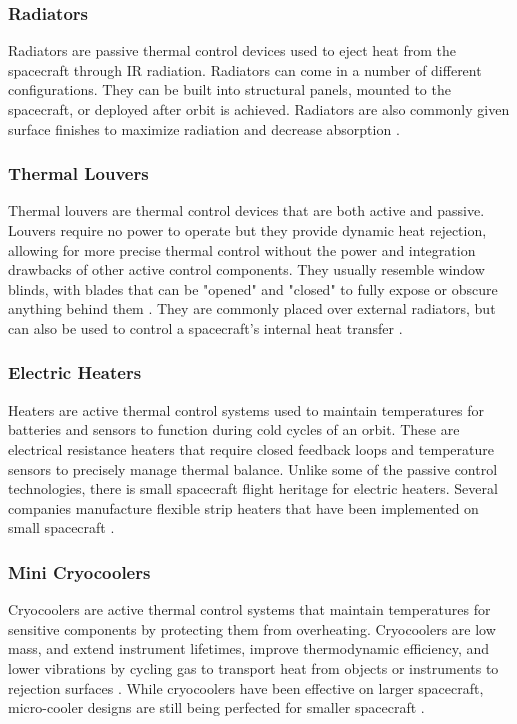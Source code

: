 \subsubsection{Radiators}
Radiators are passive thermal control devices used to eject heat from the spacecraft through IR radiation. Radiators can come in a number of different configurations. They can be built into structural panels, mounted to the spacecraft, or deployed after orbit is achieved. Radiators are also commonly given surface finishes to maximize radiation and decrease absorption \cite{SMAD}. 

\subsubsection{Thermal Louvers}
Thermal louvers are thermal control devices that are both active and passive. Louvers require no power to operate but they provide dynamic heat rejection, allowing for more precise thermal control without the power and integration drawbacks of other active control components. They usually resemble window blinds, with blades that can be "opened" and "closed" to fully expose or obscure anything behind them \cite{SMAD}. They are commonly placed over external radiators, but can also be used to control a spacecraft's internal heat transfer \cite{SMAD}.

\subsubsection{Electric Heaters}
Heaters are active thermal control systems used to maintain temperatures for batteries and sensors to function during cold cycles of an orbit. These are electrical resistance heaters that require closed feedback loops and temperature sensors to precisely manage thermal balance. Unlike some of the passive control technologies, there is small spacecraft flight heritage for electric heaters. Several companies manufacture flexible strip heaters that have been implemented on small spacecraft \cite{thermo}. 

\subsubsection{Mini Cryocoolers}
Cryocoolers are active thermal control systems that maintain temperatures for sensitive components by protecting them from overheating. Cryocoolers are low mass, and extend instrument lifetimes, improve thermodynamic efficiency, and lower vibrations by cycling gas to transport heat from objects or instruments to rejection surfaces \cite{thermo}. While cryocoolers have been effective on larger spacecraft, micro-cooler designs are still being perfected for smaller spacecraft \cite{thermo}.


